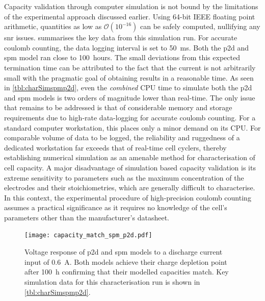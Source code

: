 Capacity validation through computer simulation  is not bound by the limitations
of the experimental approach discussed earlier. Using 64-bit IEEE floating point
arithmetic, quantities as low as $\mathcal{O}(10^{-16})$ can be safely computed,
nullifying  any \gls{snr}  issues.   summarises the  key
data  from  this  simulation  run.  For  accurate  coulomb  counting,  the  data
logging  interval  is set  to  \SI{50}{\milli\second}.  Both the  \gls{p2d}  and
\gls{spm} model ran close to 100~hours.  The small deviations from this expected
termination  time  can  be attributed  to  the  fact  that  the current  is  not
arbitrarily small with  the pragmatic goal of obtaining results  in a reasonable
time. As seen in \cref{tbl:charSimspmp2d}, even  the \emph{combined} CPU time to
simulate both  the \gls{p2d}  and \gls{spm}  models is  two orders  of magnitude
lower than  real-time. The only  issue that remains to  be addressed is  that of
considerable memory and  storage requirements due to  high-rate data-logging for
accurate coulomb counting. For a standard computer workstation, this places only
a minor  demand on  its CPU.  For comparable volume  of data  to be  logged, the
reliability  and ruggedness  of  a  dedicated workstation  far  exceeds that  of
real-time cell cyclers, thereby establishing numerical simulation as an amenable
method for characterisation of cell capacity. A major disadvantage of simulation
based capacity validation  is its extreme sensitivity to parameters  such as the
maximum concentration  of the  electrodes and  their stoichiometries,  which are
generally difficult to characterise. In this context, the experimental procedure
of  high-precision  coulomb counting  assumes  a  practical significance  as  it
requires no  knowledge of  the cell's parameters  other than  the manufacturer's
datasheet.

\begin{figure}[!htbp]
    \centering
    \texttt{[image: capacity\_match\_spm\_p2d.pdf]}
    \caption[Voltage response of  and  models
    for capacity validation]{Voltage response of \gls{p2d} and \gls{spm} models
        to a discharge current input of \SI{0.6}{A}. Both models achieve their
        charge depletion point after \approx\SI{100}{\hour} confirming that
        their modelled capacities match. Key simulation data for this
    characterisation run is shown in \cref{tbl:charSimspmp2d}.}
    \label{fig:capcharspmp2d}
\end{figure}

